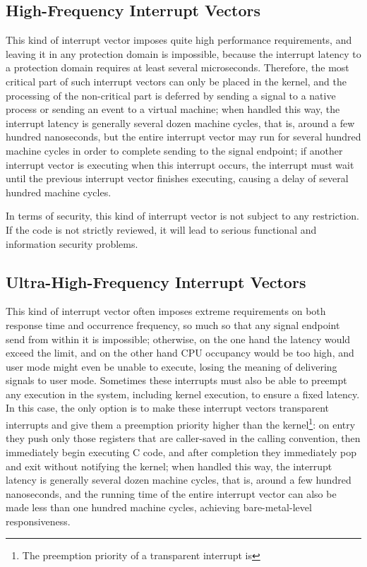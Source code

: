 \subsection{High-Frequency Interrupt Vectors}\label{subsec:6-3-3}

This kind of interrupt vector imposes quite high performance requirements, and leaving it in any protection domain is impossible, because the interrupt latency to a protection domain requires at least several microseconds. Therefore, the most critical part of such interrupt vectors can only be placed in the kernel, and the processing of the non-critical part is deferred by sending a signal to a native process or sending an event to a virtual machine; when handled this way, the interrupt latency is generally several dozen machine cycles, that is, around a few hundred nanoseconds, but the entire interrupt vector may run for several hundred machine cycles in order to complete sending to the signal endpoint; if another interrupt vector is executing when this interrupt occurs, the interrupt must wait until the previous interrupt vector finishes executing, causing a delay of several hundred machine cycles.

In terms of security, this kind of interrupt vector is not subject to any restriction. If the code is not strictly reviewed, it will lead to serious functional and information security problems.

\subsection{Ultra-High-Frequency Interrupt Vectors}\label{subsec:6-3-4}

This kind of interrupt vector often imposes extreme requirements on both response time and occurrence frequency, so much so that any signal endpoint send from within it is impossible; otherwise, on the one hand the latency would exceed the limit, and on the other hand CPU occupancy would be too high, and user mode might even be unable to execute, losing the meaning of delivering signals to user mode. Sometimes these interrupts must also be able to preempt any execution in the system, including kernel execution, to ensure a fixed latency. In this case, the only option is to make these interrupt vectors transparent interrupts and give them a preemption priority higher than the kernel\footnote{The preemption priority of a transparent interrupt is}: on entry they push only those registers that are caller-saved in the calling convention, then immediately begin executing C code, and after completion they immediately pop and exit without notifying the kernel; when handled this way, the interrupt latency is generally several dozen machine cycles, that is, around a few hundred nanoseconds, and the running time of the entire interrupt vector can also be made less than one hundred machine cycles, achieving bare-metal-level responsiveness.

